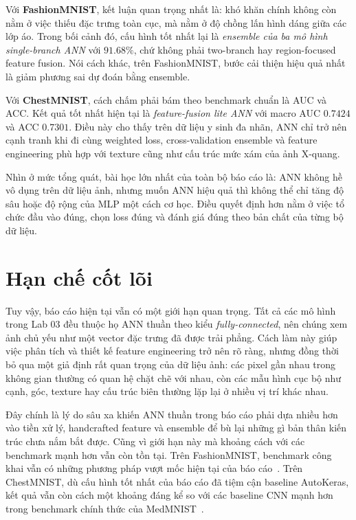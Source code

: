 Với \textbf{FashionMNIST}, kết luận quan trọng nhất là: khó khăn chính không còn nằm ở việc thiếu đặc trưng toàn cục, mà nằm ở độ chồng lấn hình dáng giữa các lớp áo. Trong bối cảnh đó, cấu hình tốt nhất lại là \textit{ensemble của ba mô hình single-branch ANN} với $91.68\%$, chứ không phải two-branch hay region-focused feature fusion. Nói cách khác, trên FashionMNIST, bước cải thiện hiệu quả nhất là giảm phương sai dự đoán bằng ensemble.

Với \textbf{ChestMNIST}, cách chấm phải bám theo benchmark chuẩn là AUC và ACC. Kết quả tốt nhất hiện tại là \textit{feature-fusion lite ANN} với macro AUC $0.7424$ và ACC $0.7301$. Điều này cho thấy trên dữ liệu y sinh đa nhãn, ANN chỉ trở nên cạnh tranh khi đi cùng weighted loss, cross-validation ensemble và feature engineering phù hợp với texture cũng như cấu trúc mức xám của ảnh X-quang.

Nhìn ở mức tổng quát, bài học lớn nhất của toàn bộ báo cáo là: ANN không hề vô dụng trên dữ liệu ảnh, nhưng muốn ANN hiệu quả thì không thể chỉ tăng độ sâu hoặc độ rộng của MLP một cách cơ học. Điều quyết định hơn nằm ở việc tổ chức đầu vào đúng, chọn loss đúng và đánh giá đúng theo bản chất của từng bộ dữ liệu.

\section{Hạn chế cốt lõi}

Tuy vậy, báo cáo hiện tại vẫn có một giới hạn quan trọng. Tất cả các mô hình trong Lab 03 đều thuộc họ ANN thuần theo kiểu \textit{fully-connected}, nên chúng xem ảnh chủ yếu như một vector đặc trưng đã được trải phẳng. Cách làm này giúp việc phân tích và thiết kế feature engineering trở nên rõ ràng, nhưng đồng thời bỏ qua một giả định rất quan trọng của dữ liệu ảnh: các pixel gần nhau trong không gian thường có quan hệ chặt chẽ với nhau, còn các mẫu hình cục bộ như cạnh, góc, texture hay cấu trúc biên thường lặp lại ở nhiều vị trí khác nhau.

Đây chính là lý do sâu xa khiến ANN thuần trong báo cáo phải dựa nhiều hơn vào tiền xử lý, handcrafted feature và ensemble để bù lại những gì bản thân kiến trúc chưa nắm bắt được. Cũng vì giới hạn này mà khoảng cách với các benchmark mạnh hơn vẫn còn tồn tại. Trên FashionMNIST, benchmark công khai vẫn có những phương pháp vượt mốc hiện tại của báo cáo~\cite{fashionmnist_repo}. Trên ChestMNIST, dù cấu hình tốt nhất của báo cáo đã tiệm cận baseline AutoKeras, kết quả vẫn còn cách một khoảng đáng kể so với các baseline CNN mạnh hơn trong benchmark chính thức của MedMNIST~\cite{medmnist_site}.

